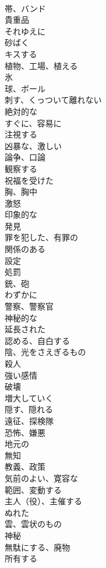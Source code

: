 \documentclass[8pt]{extreport}
\begin{document}
\begin{CJK}{UTF8}{min}
\\	帯、バンド
\\	貴重品
\\	それゆえに
\\	砂ばく
\\	キスする
\\	植物、工場、植える
\\	氷
\\	球、ボール
\\	刺す、くっついて離れない
\\	絶対的な
\\	すぐに、容易に
\\	注視する
\\	凶暴な、激しい
\\	論争、口論
\\	観察する
\\	祝福を受けた
\\	胸、胸中
\\	激怒
\\	印象的な
\\	発見
\\	罪を犯した、有罪の
\\	関係のある
\\	設定
\\	処罰
\\	銃、砲
\\	わずかに
\\	警察、警察官
\\	神秘的な
\\	延長された
\\	認める、自白する
\\	陰、光をさえぎるもの
\\	殺人
\\	強い感情
\\	破壊
\\	増大していく
\\	隠す、隠れる
\\	遠征、探検隊
\\	恐怖、嫌悪
\\	地元の
\\	無知
\\	教義、政策
\\	気前のよい、寛容な
\\	範囲、変動する
\\	主人（役）、主催する
\\	ぬれた
\\	雲、雲状のもの
\\	神秘
\\	無駄にする、廃物
\\	所有する

\end{CJK}
\end{document}
